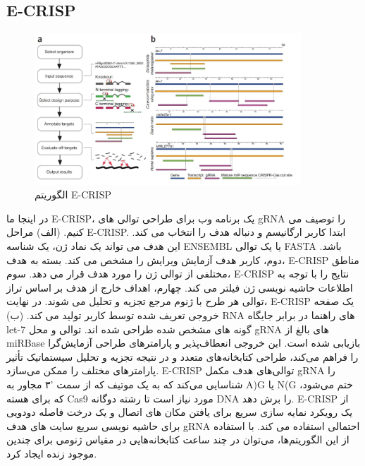 \documentclass[12pt,a4paper,BCOR=.7cm,headsepline,bibliography=totoc]{report}
\begin{document}
\subsection{E-CRISP ~\cite{E-CRISP}}
\begin{figure}
\centering
\includegraphics[width=10cm, ]{pictures/ecrispr.jpg}
\caption{
الگوریتم E-CRISP
}\label{wrap-fig:4}
\end{figure}

در اینجا ما E-CRISP، یک برنامه وب برای طراحی توالی های gRNA را توصیف می کنیم. (الف) مراحل E-CRISP. ابتدا کاربر ارگانیسم و دنباله هدف را انتخاب می کند. این هدف می تواند یک نماد ژن، یک شناسه ENSEMBL یا یک توالی FASTA باشد. دوم، کاربر هدف آزمایش ویرایش را مشخص می کند. بسته به هدف، E-CRISP مناطق مختلفی از توالی ژن را مورد هدف قرار می دهد.
سوم، E-CRISP نتایج را با توجه به اطلاعات حاشیه نویسی ژن فیلتر می کند. چهارم، اهداف خارج از هدف بر اساس تراز توالی هر طرح با ژنوم مرجع تجزیه و تحلیل می شوند. در نهایت، E-CRISP یک صفحه خروجی تعریف شده توسط کاربر تولید می کند.
(ب) RNA های راهنما در برابر جایگاه let-7 گونه های مشخص شده طراحی شده اند. توالی و محل gRNA های بالغ از miRBase بازیابی شده است. این خروجی انعطاف‌پذیر و پارامترهای طراحی آزمایش‌گرا را فراهم می‌کند، طراحی کتابخانه‌های متعدد و در نتیجه تجزیه و تحلیل سیستماتیک تأثیر پارامترهای مختلف را ممکن می‌سازد. E-CRISP توالی‌های هدف مکمل gRNA را شناسایی می‌کند که به یک موتیف که از سمت  '۳ مجاور به A)G یا N(G ختم می‌شود، که برای هسته Cas9 مورد نیاز است تا رشته دوگانه DNA را برش دهد. E-CRISP از یک رویکرد نمایه سازی سریع برای یافتن مکان های اتصال و یک درخت فاصله دودویی برای حاشیه نویسی سریع سایت های هدف gRNA احتمالی استفاده می کند. با استفاده از این الگوریتم‌ها، می‌توان در چند ساعت کتابخانه‌هایی در مقیاس ژنومی برای چندین موجود زنده ایجاد کرد.
\end{document}
